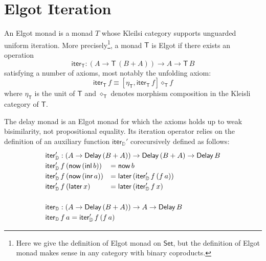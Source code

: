 \documentclass[runningheads,a4paper]{llncs}
\newcommand{\Set}{\mathsf{Set}}
\newcommand{\copair}[2]{[#1,#2]}
\newcommand{\inl}{\mathsf{inl}}
\newcommand{\inr}{\mathsf{inr}}
\newcommand{\T}{\mathsf{T}}
\newcommand{\iter}{\mathsf{iter}}
\newcommand{\Delay}{\ensuremath{\mathsf{Delay}\,}}
\newcommand{\now}{\mathsf{now}}
\newcommand{\later}{\mathsf{later}}
\newcommand{\D}{\mathbb{D}}
\newcommand{\iterD}{\mathsf{iter}_\D}
\begin{document}
\section{Elgot Iteration}\label{sec:elgot}

An Elgot monad \cite{GoncharovMR16,GoncharovSRJ18} is a monad $T$
whose Kleilsi category supports unguarded uniform iteration. More
precisely\footnote{Here we give the definition of Elgot monad on
  $\Set$, but the definition of Elgot monad makes sense in any
  category with binary coproducts.}, a monad $\T$ is Elgot if there
exists an operation
\[
\iter_\T : (A \to \T \,(B + A)) \to A \to \T\,B
\]
satisfying a number of axioms, most notably the unfolding axiom:
\[
\iter_\T\,f \equiv \copair {\eta_\T}{\iter_\T \,f} \diamond_\T f
\]
where $\eta_\T$ is the unit of $\T$ and $\diamond_\T$ denotes morphism
composition in the Kleisli category of $\T$.

The delay monad is an Elgot monad for which the axioms holds up to
weak bisimilarity, not propositional equality. Its iteration operator
relies on the definition of an auxiliary function $\iterD'$
corecursively defined as follows:
\[ %
\def\arraystretch{1.2}
\begin{array}{ll}
\multicolumn{2}{l}{\iterD' : (A \to \Delay (B + A)) \to \Delay (B + A) \to \Delay B} \\
\iterD' \,f \,(\now \,(\inl\, b)) &= \now \,b \\
\iterD' \,f \,(\now \,(\inr\, a)) &= \later \,(\iterD' \,f \,(f \,a)) \\
\iterD' \,f \,(\later \,x) &= \later \,(\iterD' \,f \,x) \\
 \\
\multicolumn{2}{l}{\iterD : (A \to \Delay (B + A)) \to A \to \Delay B} \\
\multicolumn{2}{l}{\iterD \,f \,a = \iterD' \,f \,(f \,a)}
\end{array}
\]
\end{document}
